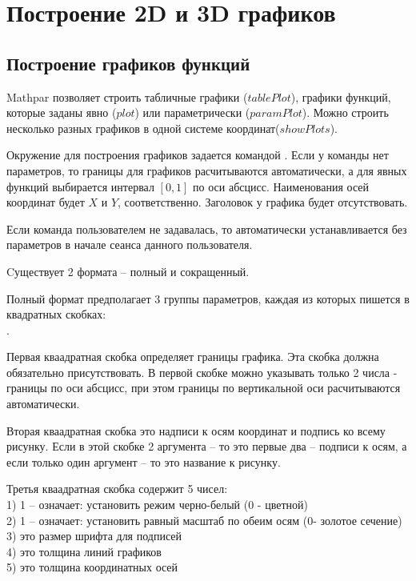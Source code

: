 \chapter{Построение 2D и 3D графиков}

\section{Построение графиков функций}
Mathpar позволяет строить табличные графики ($tablePlot$), графики функций, которые заданы явно ($plot$) или параметрически ($paramPlot$). 
Можно строить несколько разных графиков в одной системе координат($showPlots$).
  
Окружение для построения графиков задается командой .
Если у команды  нет параметров, то границы для графиков расчитываются автоматически, а для явных функций выбирается интервал 
$[0,1]$ по оси абсцисс. Наименования осей координат будет $X$ и $Y$, соответственно. Заголовок у графика будет отсутствовать.
   
Если команда  пользователем не задавалась, то автоматически устанавливается  без параметров в начале сеанса
данного пользователя.

Cуществует 2 формата -- полный и сокращенный.

 Полный  формат  предполагает 3 группы параметров, каждая из которых 
пишется в квадратных скобках:\\
.

Первая кваадратная скобка определяет границы графика. 
Эта скобка должна обязательно присутствовать. 
В первой скобке можно указывать только 2 числа - границы по оси абсцисс, при этом
границы по вертикальной оси расчитываются автоматически.

Вторая  кваадратная скобка это надписи к осям координат и подпись ко всему рисунку.
Если в этой скобке 2 аргумента -- то это первые два -- подписи к осям,
а если только один аргумент -- то это название к рисунку.

Третья  кваадратная скобка содержит 5 чисел: \\
1) 1 -- означает: установить режим черно-белый (0 - цветной)\\
2) 1 -- означает: установить равный масштаб по обеим осям (0- золотое сечение)\\
3)  это размер шрифта для подписей\\
4)  это толщина линий графиков\\
5)  это толщина координатных осей\\

